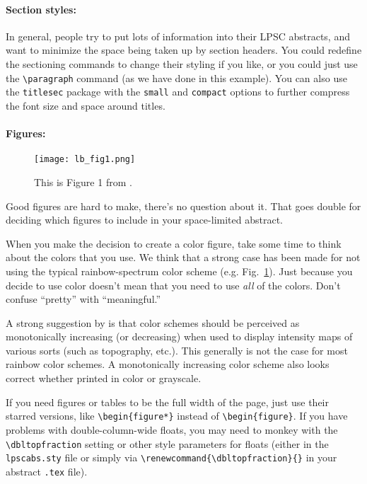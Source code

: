 \documentclass[twoside]{article}
\begin{document}
\paragraph{Section styles:}

In general, people try to put lots of information into their LPSC
abstracts, and want to minimize the space being taken up by section
headers.  You could redefine the sectioning commands to change their
styling if you like, or you could just use the \verb=\paragraph=
command (as we have done in this example).  You can also use the
\texttt{titlesec} package with the \texttt{small} and \texttt{compact}
options to further compress the font size and space around titles.


\paragraph{Figures:}

\begin{figure}
\centering
\texttt{[image: lb\_fig1.png]}
\caption[Color Scales and Color-Deficient-Viewer Simulations]{
    \label{color_scales}
    This is Figure 1 from \citet{2004EOSTr..85..385L}.  
    }
\end{figure}

Good figures are hard to make, there's no question about it.  That
goes double for deciding which figures to include in your 
space-limited abstract.

When you make the decision to create a color figure, take some time
to think about the colors that you use.  We think that a 
strong case has been made \citep{2004EOSTr..85..385L,borland2007rainbow} for not using the
typical rainbow-spectrum color scheme (e.g. Fig.~\ref{color_scales}).
Just because you decide to use color doesn't mean that you need to
use \emph{all} of the colors.  Don't confuse ``pretty'' with
``meaningful.''

A strong suggestion by \citep{green2011colour} is that color schemes
should be perceived as monotonically increasing (or decreasing)
when used to display intensity maps of various sorts (such as
topography, etc.). This generally is not the case for most rainbow
color schemes. A monotonically increasing color scheme also looks
correct whether printed in color or grayscale.

If you need figures or tables to be the full width of the page,
just use their starred versions, like \verb=\begin{figure*}= instead
of \verb=\begin{figure}=.  If you have problems with double-column-wide
floats, you may need to monkey with the \verb=\dbltopfraction=
setting or other style parameters for floats (either in the
\texttt{lpscabs.sty} file or simply via
\verb=\renewcommand{\dbltopfraction}{}= in your abstract \texttt{.tex}
file).
\end{document}
